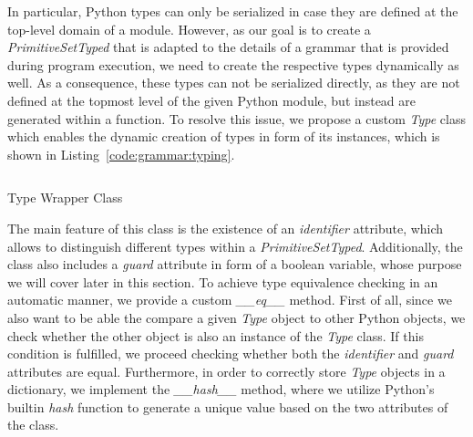 In particular, Python types can only be serialized in case they are defined at the top-level domain of a module.
However, as our goal is to create a \emph{PrimitiveSetTyped} that is adapted to the details of a grammar that is provided during program execution, we need to create the respective types dynamically as well.
As a consequence, these types can not be serialized directly, as they are not defined at the topmost level of the given Python module, but instead are generated within a function.
To resolve this issue, we propose a custom \emph{Type} class which enables the dynamic creation of types in form of its instances, which is shown in Listing~\ref{code:grammar:typing}.
\begin{listing}
	\inputminted{python}{evostencils/grammar/typing.py}
	\caption{Type Wrapper Class}
	\label{code:grammar:typing}
\end{listing}
The main feature of this class is the existence of an \emph{identifier} attribute, which allows to distinguish different types within a \emph{PrimitiveSetTyped}.
Additionally, the class also includes a \emph{guard} attribute in form of a boolean variable, whose purpose we will cover later in this section. 
To achieve type equivalence checking in an automatic manner, we provide a custom \emph{\_\_eq\_\_} method.
First of all, since we also want to be able the compare a given \emph{Type} object to other Python objects, we check whether the other object is also an instance of the \emph{Type} class.
If this condition is fulfilled, we proceed checking whether both the \emph{identifier} and \emph{guard} attributes are equal.
Furthermore, in order to correctly store \emph{Type} objects in a dictionary, we implement the \emph{\_\_hash\_\_} method, where we utilize Python's builtin \emph{hash} function to generate a unique value based on the two attributes of the class. 

